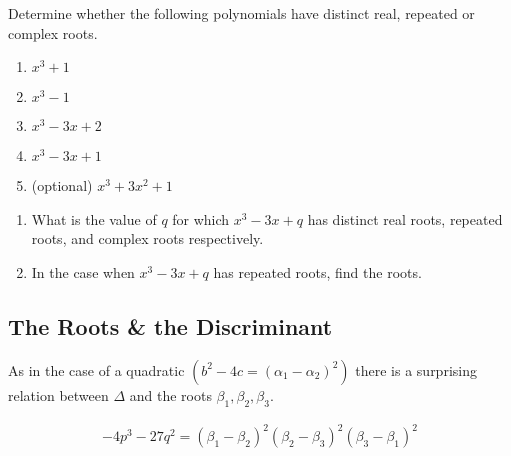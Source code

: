 \begin{questions}[resume]
  \item Determine whether the following polynomials have distinct real, repeated or complex roots. 
	\begin{enumerate}
		\item $ x^3 + 1$
		\item $ x^3 - 1$
		\item $ x^3 - 3x + 2 $
		\item $ x^3 - 3x + 1 $
		\item (optional) $x^3 + 3x^2 + 1$
	\end{enumerate}
\end{questions}

\begin{questions}[resume]
	\item \begin{enumerate}
		\item What is the value of $ q$ for which $ x^3 -3x + q$ has distinct real roots, repeated roots, and complex roots respectively.
		\item In the case when $ x^3 - 3x + q$ has repeated roots, find the roots.
	\end{enumerate}
\end{questions}






\newpage
\subsection{The Roots \& the Discriminant}
As in the case of a quadratic $\left( b^2 - 4c = (\alpha_1 - \alpha_2)^2 \right)$ there is a surprising relation between $ \Delta$ and the roots $ \beta_1, \beta_2, \beta_3$. 

\begin{thm}
\label{thm:discriminant}
	\begin{align*}
		-4p^3 - 27q^2 = (\beta_1 - \beta_2)^2(\beta_2 - \beta_3)^2(\beta_3 - \beta_1)^2 
	\end{align*}
\end{thm}

